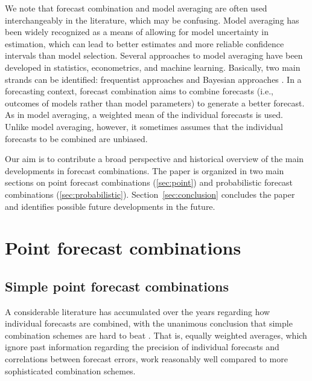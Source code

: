 \documentclass[a4paper,11pt]{article}
\begin{document}
We note that forecast combination and model averaging are often used interchangeably in the literature, which may be confusing. Model averaging has been widely recognized as a means of allowing for model uncertainty in estimation, which can lead to better estimates and more reliable confidence intervals than model selection. Several approaches to model averaging have been developed in statistics, econometrics, and machine learning. Basically, two main strands can be identified: frequentist approaches \citep[e.g.,][]{Fletcher2018-ma} and Bayesian approaches \citep[e.g.][]{Steel2020-ma}. In a forecasting context, forecast combination aims to combine forecasts (i.e., outcomes of models rather than model parameters) to generate a better forecast. As in model averaging, a weighted mean of the individual forecasts is used. Unlike model averaging, however, it sometimes assumes that the individual forecasts to be combined are unbiased.

Our aim is to contribute a broad perspective and historical overview of the main developments in forecast combinations. The paper is organized in two main sections on point forecast combinations (\autoref{sec:point}) and probabilistic forecast combinations (\autoref{sec:probabilistic}). Section~\ref{sec:conclusion} concludes the paper and identifies possible future developments in the future.

\section{Point forecast combinations}
\label{sec:point}

\subsection{Simple point forecast combinations}
\label{sec:simple_comb}

A considerable literature has accumulated over the years regarding how individual forecasts are combined, with the unanimous conclusion that simple combination schemes are hard to beat \citep{Kang1986-kq,Clemen1989-fb,Fischer1999-kz,Stock2004-rq,Lichtendahl2020-ut}. That is, equally weighted averages, which ignore past information regarding the precision of individual forecasts and correlations between forecast errors, work reasonably well compared to more sophisticated combination schemes.
\end{document}

